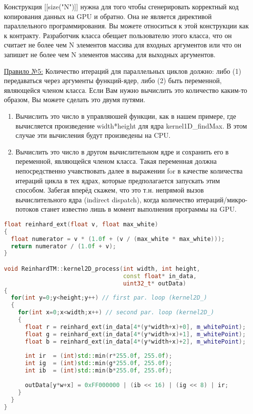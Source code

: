 \documentclass[11pt,fleqn,english,russian]{report} %
\begin{document}
\begin{remark}
Конструкция [[size("N")]] нужна для того чтобы сгенерировать корректный код копирования данных на GPU и обратно. Она не является директивой параллельного программирования. Вы можете относиться к этой конструкции как к контракту. Разработчик класса обещает пользователю этого класса, что он считает не более чем N элементов массива для входных аргументов или что он запишет не более чем N элементов массива для выходных аргументов. 
\end{remark}	

\underline{Правило №5:} Количество итераций для параллельных циклов должно: либо (1) передаваться через аргументы функций-ядер, либо (2) быть переменной, являющейся членом класса. Если Вам нужно вычислить это количество каким-то образом, Вы можете сделать это двумя путями.
\begin{enumerate}
\item Вычислить это число в управляюшей функции, как в нашем примере, где вычисляется произведение width*height для ядра kernel1D\_findMax. В этом случае эти вычисления будут произведены на CPU.
\item Вычислить это число в другом вычислительном ядре и сохранить его в переменной, являющейся членом класса. Такая переменная должна непосредственно учавствовать далее в выражении for в качестве количества итераций цикла в тех ядрах, которые предполагается запускать этим способом. Забегая вперёд скажем, что это т.н. непрямой вызов вычислительного ядра (indirect dispatch), когда количество итераций/микро-потоков станет известно лишь в момент выполнения программы на GPU. 
\end{enumerate}

\begin{lstlisting}[language=C++, 
	               caption=двумерное вычислительное ядро вызывает функцию reinhard\_ext, 
	               label=lst:kernel2D_process]	
float reinhard_ext(float v, float max_white)
{
  float numerator = v * (1.0f + (v / (max_white * max_white)));
  return numerator / (1.0f + v);
}

void ReinhardTM::kernel2D_process(int width, int height, 
                                  const float* in_data, 
                                  uint32_t* outData)
{
  for(int y=0;y<height;y++) // first par. loop (kernel2D_)
  {
    for(int x=0;x<width;x++) // second par. loop (kernel2D_)
    {
      float r = reinhard_ext(in_data[4*(y*width+x)+0], m_whitePoint);
      float g = reinhard_ext(in_data[4*(y*width+x)+1], m_whitePoint);
      float b = reinhard_ext(in_data[4*(y*width+x)+2], m_whitePoint);
			
      int ir  = (int)std::min(r*255.0f, 255.0f);
      int ig  = (int)std::min(g*255.0f, 255.0f);
      int ib  = (int)std::min(b*255.0f, 255.0f);
			
      outData[y*w+x] = 0xFF000000 | (ib << 16) | (ig << 8) | ir;
    }
  }
}
\end{lstlisting}
\end{document}
